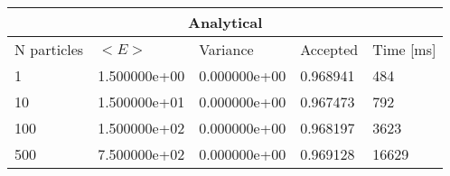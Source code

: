 \begin{tabular}{|l|l|l|l|l|}
\hline 
\multicolumn{5}{|c|}{Analytical}\\ 
\hline 
N particles & $<E>$ & Variance & Accepted & Time [ms]\\ 
 \hline 
1 & 1.500000e+00 & 0.000000e+00 & 0.968941 & 484 \\ 
\hline10 & 1.500000e+01 & 0.000000e+00 & 0.967473 & 792 \\ 
\hline100 & 1.500000e+02 & 0.000000e+00 & 0.968197 & 3623 \\ 
\hline500 & 7.500000e+02 & 0.000000e+00 & 0.969128 & 16629 \\ 
\hline\end{tabular}